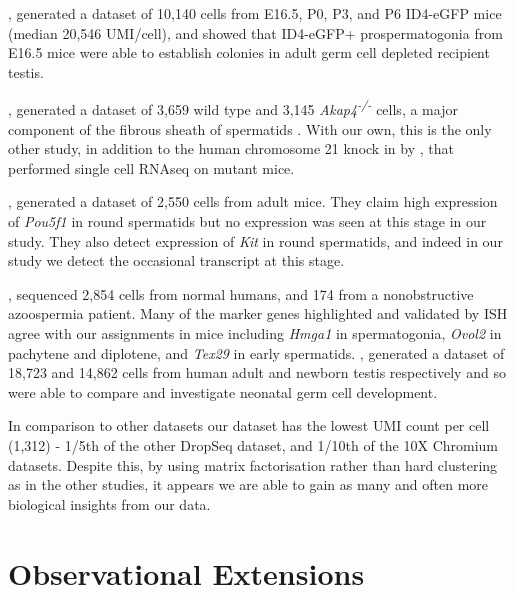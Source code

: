 \cite{Law2019Developmental}, generated a dataset of 10,140 cells from E16.5, P0, P3, and P6 ID4-eGFP mice (median 20,546 UMI/cell), and showed that ID4-eGFP+ prospermatogonia from E16.5 mice were able to establish colonies in adult germ cell depleted recipient testis.

\cite{Fang2019Proteomics}, generated a dataset of 3,659 wild type and 3,145 \textit{Akap4\textsuperscript{-/-}} cells, a major component of the fibrous sheath of spermatids \parencite{Eddy2003Fibrous}. With our own, this is the only other study, in addition to the human chromosome 21 knock in by \cite{Ernst2019Staged}, that performed single cell RNAseq on mutant mice.

\cite{Lukassen2018Characterization}, generated a dataset of 2,550 cells from adult mice. They claim high expression of \textit{Pou5f1} in round spermatids but no expression was seen at this stage in our study. They also detect expression of \textit{Kit} in round spermatids, and indeed in our study we detect the occasional transcript at this stage. 


\cite{Wang2018SingleCell}, sequenced 2,854 cells from normal humans, and 174 from a nonobstructive azoospermia patient. Many of the marker genes highlighted and validated by ISH agree with our assignments in mice including \textit{Hmga1} in spermatogonia, \textit{Ovol2} in pachytene and diplotene, and \textit{Tex29} in early spermatids. \cite{Sohni2019Neonatal}, generated a dataset of 18,723 and 14,862 cells from human adult and newborn testis respectively and so were able to compare and investigate neonatal germ cell development.

In comparison to other datasets our dataset has the lowest UMI count per cell (1,312) - 1/5th of the other DropSeq dataset, and 1/10th of the 10X Chromium datasets. Despite this, by using matrix factorisation rather than hard clustering as in the other studies, it appears we are able to gain as many and often more biological insights from our data.

\section{Observational Extensions}

